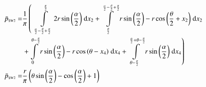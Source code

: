 \begin{align}
    \bar{p}_{\text{\tiny{SW2}}} =&\frac{1}{\pi} \left(\;\;\int\limits_{\frac{\alpha}{2} - \frac{\theta}{2} + \frac{\pi}{2}}^{\frac{\pi}{2}}2 r \sin{\left (\frac{\alpha}{2} \right )}\;\mathrm{d}x_{2}+\int\limits_{\frac{\theta}{2}}^{\frac{\alpha}{2} - \frac{\theta}{2} + \frac{\pi}{2}}r \sin{\left (\frac{\alpha}{2} \right )} - r \cos{\left (\frac{\theta}{2} + x_{2} \right )}\;\mathrm{d}x_{2}\right.\notag\\
 &\left.+\int\limits_{0}^{\theta - \frac{\pi}{2}}r \sin{\left (\frac{\alpha}{2} \right )} - r \cos{\left (\theta - x_{4} \right )}\;\mathrm{d}x_{4}+\int\limits_{\theta - \frac{\pi}{2}}^{\frac{\alpha}{2} + \theta - \frac{\pi}{2}}r \sin{\left (\frac{\alpha}{2} \right )}\;\mathrm{d}x_{4}\right)\label{pSW2Def}\\
    \bar{p}_{\text{\tiny{SW2}}}  =& \frac{r}{\pi} \left(\theta \sin{\left (\frac{\alpha}{2} \right )} - \cos{\left (\frac{\alpha}{2} \right )} + 1\right)\label{pSW2Sln}
\end{align}